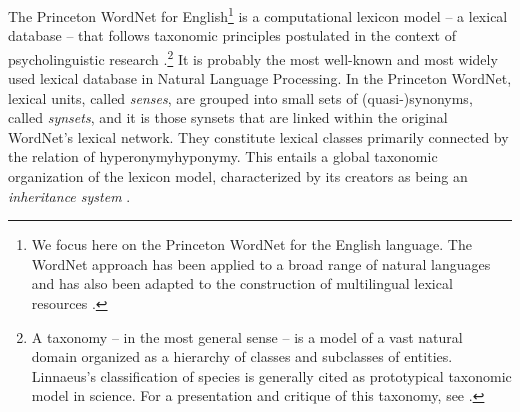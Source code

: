 The Princeton WordNet for English\footnote{We focus here on the Princeton WordNet for the English language. The WordNet approach has been applied to a broad range of natural languages and has also been adapted to the construction of multilingual lexical resources \parencite{FellbaumVossen2012}.} is a computational lexicon model -- a lexical database -- that follows taxonomic principles postulated in the context of psycholinguistic research \parencite{MillerEtAl1990}.\footnote{A taxonomy -- in the most general sense -- is a model of a vast natural domain organized as a hierarchy of classes and subclasses of entities. Linnaeus's classification of species is generally cited as prototypical taxonomic model in science. For a presentation and critique of this taxonomy, see \textcite{Ereshefsky1994}.} It is probably the most well\pagebreak-known and most widely used lexical database in Natural Language Processing. In the Princeton WordNet, lexical units, called \textit{senses}, are grouped into small sets of \mbox{(quasi-)}synonyms, called \textit{synsets}, and it is those synsets that are linked within the original WordNet's lexical network. They constitute lexical classes primarily connected by the relation of hyperonymy\slashs{}hyponymy. This entails a global taxonomic organization of the lexicon model, characterized by its creators as being an \textit{inheritance system} \parencite[242]{MillerEtAl1990}.

